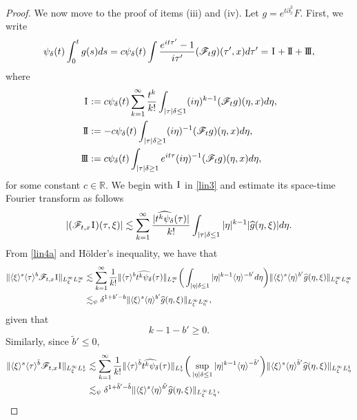 \documentclass[a4paper, 11pt]{amsart}
\newcommand{\R}{\mathbb{R}}
\newcommand{\jap}[1]{\langle #1 \rangle}
\theoremstyle{plain}
\theoremstyle{definition}
\theoremstyle{remark}
\newcommand{\I}{\hspace{0.2mm}\textup{I}\hspace{0.2mm}}
\newcommand{\II}{\text{I \hspace{-2.9mm} I} }
\newcommand{\III}{\text{I \hspace{-2.9mm} I \hspace{-2.9mm} I}}
\newcommand{\5}{\text{V}}
\newcommand{\noi}{\noindent}
\newcommand{\ft}{\widehat}
\newcommand{\les}{\lesssim}
\newcommand{\dl}{\delta}
\newcommand{\F}{\mathcal{F}}
\numberwithin{equation}{section}
\theoremstyle{mytheoremstyle} \newtheorem{nota}[thm]{Remark}
\theoremstyle{mytheoremstyle} \newtheorem{exemplo}[thm]{Example}
\begin{document}
\begin{proof}
\smallskip
\noi 
We now move to the proof of items (iii) and (iv).
 Let $g=e^{t\partial_x^3} F$. First, we write
\begin{equation}
\psi_\delta(t)\int_0^t g(s) ds = c\psi_\delta(t)\int \frac{e^{it\tau'}-1}{i\tau'} (\mathcal{F}_tg)(\tau',x) d\tau' = \I + \II + \III,
\label{lin3a}
\end{equation}
where
\begin{equation}
\label{lin3}
\begin{aligned}
\I & :=c\psi_\delta(t)\sum_{k= 1}^\infty \frac{t^k}{k!}\int_{|\tau|\delta \le 1} (i\eta)^{k-1} (\mathcal{F}_tg)(\eta,x) d\eta, \\
\II& :=-c\psi_\delta(t)\int_{|\tau|\delta \ge 1} (i\eta)^{-1} (\mathcal{F}_tg)(\eta,x) d\eta , \\
\III & :=c\psi_\delta(t)\int_{|\tau|\delta \ge 1} e^{it\tau}(i\eta)^{-1} (\mathcal{F}_tg)(\eta,x) d\eta,
\end{aligned}
\end{equation}
for some constant $c\in\R$.
%
%
%
We begin with $\I$ in \eqref{lin3} and estimate its space-time Fourier transform as follows
\begin{equation}
	|(\mathcal{F}_{t,x}\I)(\tau, \xi)| \les \sum_{k= 1}^\infty \frac{|\widehat{t^k\psi_\delta}(\tau)|}{k!} \int_{|\tau|\delta \le 1} |\eta|^{k-1} |\ft{g}(\eta,\xi)| d\eta.
\label{lin4a}
\end{equation}
From \eqref{lin4a} and H\"older's inequality, we have that
\begin{equation}
\begin{aligned}
\| \jap{\xi}^s \jap{\tau}^b \F_{t,x} \I \|_{L^\infty_\xi L^\infty_\tau} & \les \sum_{k=1}^\infty \frac{1}{k!} \| \jap{\tau}^b\ft{t^k \psi_\dl} (\tau) \|_{L^\infty_\tau} \bigg( \int_{|\eta|\dl \le 1} |\eta|^{k-1} \jap{\eta}^{-b'} d\eta \bigg) \| \jap{\xi}^s \jap{\eta}^{b'} \ft{g}(\eta, \xi) \|_{L^\infty_\xi L^\infty_\eta} \\
& \les_\psi \dl^{1+ b' -b} \| \jap{\xi}^s \jap{\eta}^{b'} \ft{g}(\eta, \xi) \|_{L^\infty_\xi L^\infty_\eta},
\end{aligned}
\label{lin4b}
\end{equation}
\noi
given that
\begin{equation}
k-1-b' \ge 0 .
\label{lin4bb}
\end{equation}
Similarly, since $\tilde{b}'\le 0$,
\begin{equation}
\begin{aligned}
\| \jap{\xi}^s \jap{\tau}^{\tilde{b}} \F_{t,x} \I \|_{L^\infty_\xi L^1_\tau} & \les \sum_{k=1}^\infty \frac{1}{k!} \| \jap{\tau}^{\tilde{b}}\ft{t^k \psi_\dl} (\tau) \|_{L^1_\tau} \bigg( \sup_{|\eta|\dl \le 1} |\eta|^{k-1} \jap{\eta}^{-\tilde{b}'}  \bigg) \| \jap{\xi}^s \jap{\eta}^{\tilde{b}'} \ft{g}(\eta, \xi) \|_{L^\infty_\xi L^1_\eta} \\
& \les_\psi \dl^{1+ \tilde{b}' -\tilde{b}} \| \jap{\xi}^s \jap{\eta}^{\tilde{b'}} \ft{g}(\eta, \xi) \|_{L^\infty_\xi L^1_\eta},
\end{aligned}
\label{lin4c}
\end{equation}




\end{proof}
\end{document}
